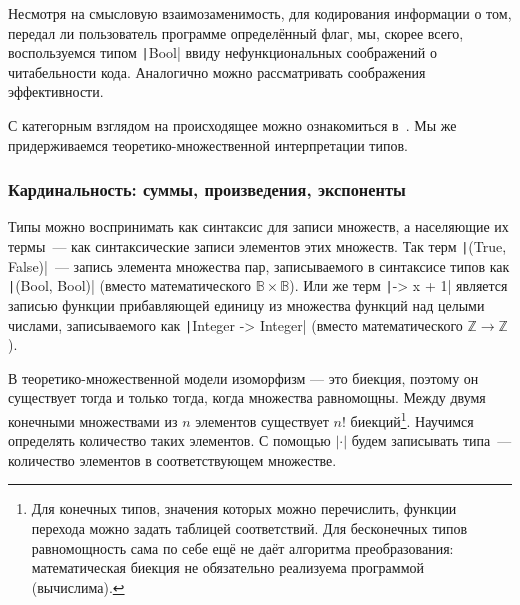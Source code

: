 Несмотря на смысловую взаимозаменимость, для кодирования информации о том, передал ли пользователь программе определённый флаг, мы, скорее всего, воспользуемся типом \texttt|Bool| ввиду нефункциональных соображений о читабельности кода.
Аналогично можно рассматривать соображения эффективности.

С категорным взглядом на происходящее можно ознакомиться в~\cite{hinze2010reason}.
Мы же придерживаемся теоретико-множественной интерпретации типов.

\subsubsection{Кардинальность: суммы, произведения, экспоненты} \label{subsubsec:cardinality}

Типы можно воспринимать как синтаксис для записи множеств, а населяющие их термы~--- как синтаксические записи элементов этих множеств.
Так терм \texttt|(True, False)|~--- запись элемента множества пар, записываемого в синтаксисе типов как \texttt|(Bool, Bool)| (вместо математического $\mathbb{B}\times\mathbb{B}$).
Или же терм \texttt|\x -> x + 1| является записью функции прибавляющей единицу из множества функций над целыми числами, записываемого как \texttt|Integer -> Integer| (вместо математического $\mathbb{Z}\to\mathbb{Z}$).

В теоретико-множественной модели изоморфизм --- это биекция, поэтому он существует тогда и только тогда, когда множества равномощны.
Между двумя конечными множествами из $n$ элементов существует $n!$ биекций\footnote{Для конечных типов, значения которых можно перечислить, функции перехода можно задать таблицей соответствий.
Для бесконечных типов равномощность сама по себе ещё не даёт алгоритма преобразования: математическая биекция не обязательно реализуема программой (вычислима).}.
Научимся определять количество таких элементов.
С помощью $|\cdot|$ будем записывать  типа~--- количество элементов в соответствующем множестве.


